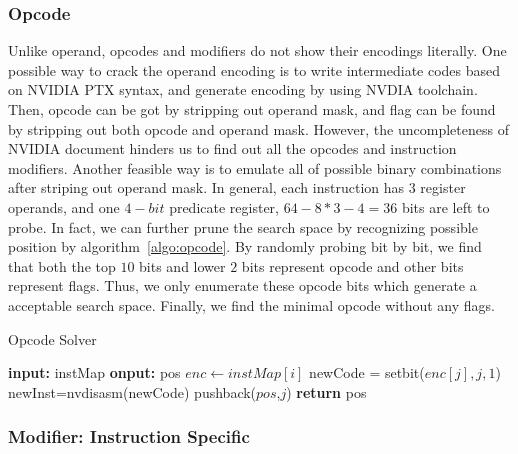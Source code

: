 \subsubsection{Opcode}
Unlike operand, opcodes and modifiers do not show their encodings literally. One possible way to crack the operand 
encoding is to write intermediate codes
based on NVIDIA PTX syntax, and generate encoding by using NVDIA toolchain.
Then, opcode can be got by stripping out operand mask, and flag can be found by stripping out both opcode and operand 
mask. However, the uncompleteness of NVIDIA document hinders us to find out all the opcodes and instruction modifiers. 
Another feasible way is to emulate all of possible binary combinations after striping out operand mask.
In general, each instruction has $3$ register operands, and one $4-bit$ predicate register, $64-8*3-4=36$ bits are left 
to probe.
In fact, we can further prune the search space by recognizing possible position by algorithm~\ref{algo:opcode}. By 
randomly probing bit by bit, we find that both the top $10$ bits and lower $2$ bits represent opcode and other bits 
represent flags. Thus, we only enumerate these opcode bits which generate a acceptable search space. Finally, we find 
the minimal opcode without any flags. 


\begin{algorithm}
      \caption{Opcode Solver}\label{algo:opcode}
  \begin{algorithmic}[1]
      \State \textbf {input:} instMap
      \State \textbf {onput:} pos
      \State $enc \gets instMap[i]$ 
      \State newCode = setbit($enc[j], j, 1$)
      \State newInst=nvdisasm(newCode)
      \State pushback($pos$,$j$)
      \EndIf
      \EndIf
      \EndFor
      \EndFor
      \State \textbf{return} pos
  \end{algorithmic}
\end{algorithm}

\subsubsection{Modifier: Instruction Specific}

